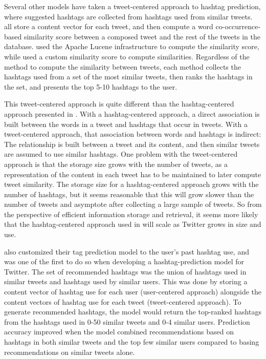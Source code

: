 \documentclass[man,floatsintext,donotrepeattitle]{apa6}
\begin{document}
Several other models have taken a tweet-centered approach to hashtag prediction, where suggested hashtags are collected from hashtags used from similar tweets.
\textcites{Li2011, Zangerle2011, Kywe2012} all store a content vector for each tweet, and then compute a word co-occurrence-based similarity score between a composed tweet and the rest of the tweets in the database.
\textcites{Zangerle2011, Kywe2012} used the Apache Lucene infrastructure to compute the similarity score, while \textcite{Li2011} used a custom similarity score to compute similarities.
Regardless of the method to compute the similarity between tweets,
each method collects the hashtags used from a set of the most similar tweets, then ranks the hashtags in the set, and presents the top 5-10 hashtags to the user.

This tweet-centered approach is quite different than the hashtag-centered approach presented in \textcite{Mazzia2009}.
With a hashtag-centered approach, a direct association is built between the words in a tweet and hashtags that occur in tweets.
With a tweet-centered approach, that association between words and hashtags is indirect:
The relationship is built between a tweet and its content, and then similar tweets are assumed to use similar hashtags.
One problem with the tweet-centered approach is that the storage size grows with the number of tweets, as a representation of the content in each tweet has to be maintained to later compute tweet similarity.
The storage size for a hashtag-centered approach grows with the number of hashtags, but it seems reasonable that this will grow slower than the number of tweets and asymptote after collecting a large sample of tweets.
So from the perspective of efficient information storage and retrieval, it seems more likely that the hashtag-centered approach used in \textcite{Mazzia2009} will scale as Twitter grows in size and use.

\textcite{Kywe2012} also customized their tag prediction model to the user's past hashtag use, and was one of the first to do so when developing a hashtag-prediction model for Twitter.
The set of recommended hashtags was the union of hashtags used in similar tweets and hashtags used by similar users.
This was done by storing a content vector of hashtag use for each user (user-centered approach) alongside the content vectors of hashtag use for each tweet (tweet-centered approach).
To generate recommended hashtags, the model would return the top-ranked hashtags from the hashtags used in 0-50 similar tweets and 0-4 similar users.
Prediction accuracy improved when the model combined recommendations based on hashtags in both similar tweets and the top few similar users compared to basing recommendations on similar tweets alone. 
\end{document}

